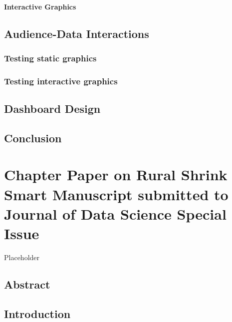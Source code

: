\documentclass[print]{nuthesis}
\begin{document}
\hypertarget{interactive-graphics}{%
\subsubsection{Interactive Graphics}\label{interactive-graphics}}

\hypertarget{audience-data-interactions}{%
\section{Audience-Data Interactions}\label{audience-data-interactions}}

\hypertarget{testing-static-graphics}{%
\subsection{Testing static graphics}\label{testing-static-graphics}}

\hypertarget{testing-interactive-graphics}{%
\subsection{Testing interactive graphics}\label{testing-interactive-graphics}}

\hypertarget{dashboard-design}{%
\section{Dashboard Design}\label{dashboard-design}}

\hypertarget{conclusion}{%
\section{Conclusion}\label{conclusion}}

\hypertarget{rmd-basics}{%
\chapter{Chapter Paper on Rural Shrink Smart Manuscript submitted to Journal of Data Science Special Issue}\label{rmd-basics}}

Placeholder

\hypertarget{abstract}{%
\section{Abstract}\label{abstract}}

\hypertarget{introduction-1}{%
\section{Introduction}\label{introduction-1}}
\end{document}
